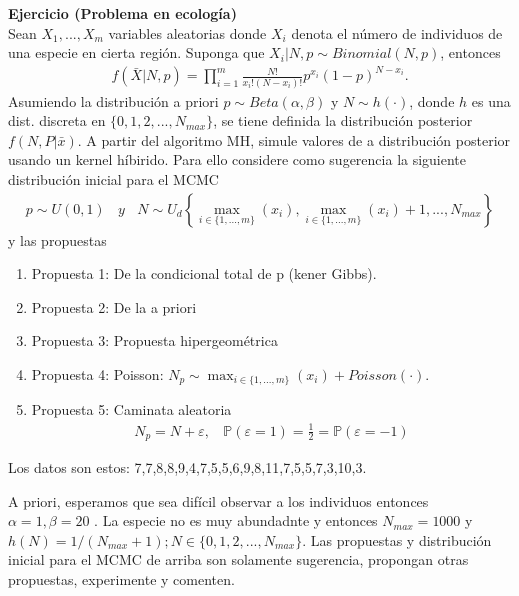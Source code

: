 \documentclass[a4paper, 11pt]{article}
\newenvironment{problem}[2][Ejercicio]
{ \begin{mdframed}[backgroundcolor= red!50] \textbf{#1 #2} \\}
	{  \end{mdframed}}
\begin{document}
\begin{problem}{(Problema en ecología)} 
    Sean $X_1, ..., X_m$ variables aleatorias donde $X_i$ denota el número de individuos de una especie en cierta región. Suponga que $X_i|N,p\sim Binomial(N,p)$, entonces 
    \begin{align*}
        f(\bar{X}|N,p) = \prod_{i = 1}^{m} \frac{N!}{x_i!(N-x_i)!} p^{x_i}(1-p)^{N-x_i}.
    \end{align*}
    Asumiendo la distribución a priori $p\sim Beta(\alpha,\beta)$ y $N\sim h(\cdot)$, donde $h$ es una dist. discreta en $\{0,1,2,...,N_{max}\}$, se tiene definida la distribución posterior $f(N,P|\bar{x})$.
    A partir del algoritmo MH, simule valores de a distribución posterior usando un kernel híbirido. Para ello considere como sugerencia la siguiente distribución inicial para el MCMC 
    \begin{align*}
        p \sim U(0,1)   \:\:\:\: y \:\:\:\: N\sim U_d \left \{  \max_{i\in \{1,...,m\} } (x_i), \max_{i\in \{1,...,m\} } (x_i) + 1, ..., N_{max} \right \}
    \end{align*}
    y las propuestas
    \begin{enumerate}
        \item Propuesta 1: De la condicional total de p (kener Gibbs).
        \item Propuesta 2: De la a priori
        \item Propuesta 3: Propuesta hipergeométrica
        \item Propuesta 4: Poisson: $N_p \sim \max_{i \in \{1,...,m\} }(x_i) + Poisson(\cdot)$.
        \item Propuesta 5: Caminata aleatoria 
        \begin{align*}
            N_p = N + \varepsilon, \:\:\:\: \mathbb{P}\left (\varepsilon = 1 \right ) = \frac{1}{2} = \mathbb{P}\left (\varepsilon = -1 \right )    
        \end{align*}
    \end{enumerate}
    Los datos son estos: 7,7,8,8,9,4,7,5,5,6,9,8,11,7,5,5,7,3,10,3.

    A priori, esperamos que sea difícil observar a los individuos entonces $\alpha = 1, \beta = 20$ . La especie no es muy abundadnte y entonces $N_{max} = 1000$ y $h(N) = 1/(N_{max} +1); N \in \{0,1,2,...,N_{max}\}$.
    Las propuestas y distribución inicial para el MCMC de arriba son solamente sugerencia, propongan otras propuestas, experimente y comenten.
\end{problem}
    
\end{document}
